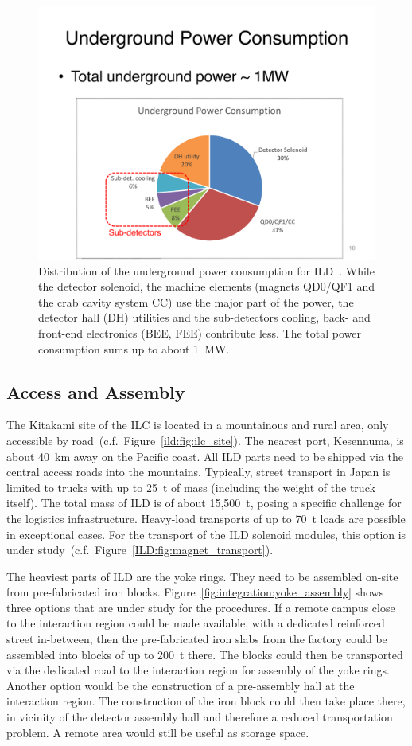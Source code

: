 \begin{figure}[h!]
\includegraphics[width=0.7\hsize]{Integration/fig/Power.pdf}
\caption{\label{fig:integration:power}Distribution of the underground power consumption for ILD~\cite{ild:bib:services}. While the detector solenoid, the machine elements (magnets QD0/QF1 and the crab cavity system CC) use the major part of the power, the detector hall (DH) utilities and the sub-detectors cooling, back- and front-end electronics (BEE, FEE) contribute less. The total power consumption sums up to about 1~MW.}
\end{figure}
\vspace{2cm}
\FloatBarrier

\subsection{Access and Assembly}
\label{ild:sec:access}
The Kitakami site of the ILC is located in a mountainous and rural area, only accessible by road~(c.f.~Figure~\ref{ild:fig:ilc_site}). The nearest port, Kesennuma, is about 40~km away on the Pacific coast. All ILD parts need to be shipped via the central access roads into the mountains. Typically, street transport in Japan is limited to trucks with up to 25~t of mass (including the weight of the truck itself). The total mass of ILD is of about 15,500~t, posing a specific challenge for the logistics infrastructure. Heavy-load transports of up to 70~t loads are possible in exceptional cases. For the transport of the ILD solenoid modules, this option is under study~(c.f.~Figure~\ref{ILD:fig:magnet_transport}).

The heaviest parts of ILD are the yoke rings. They need to be assembled on-site from pre-fabricated iron blocks. Figure~\ref{fig:integration:yoke_assembly} shows three options that are under study for the procedures. If a remote campus close to the interaction region could be made available, with a dedicated reinforced street in-between, then the pre-fabricated iron slabs from the factory could be assembled into blocks of up to 200~t there. The blocks could then be transported via the dedicated road to the interaction region for assembly of the yoke rings. Another option would be the construction of a pre-assembly hall at the interaction region. The construction of the iron block could then take place there, in vicinity of the detector assembly hall and therefore a reduced transportation problem. A remote area would still be useful as storage space. 

